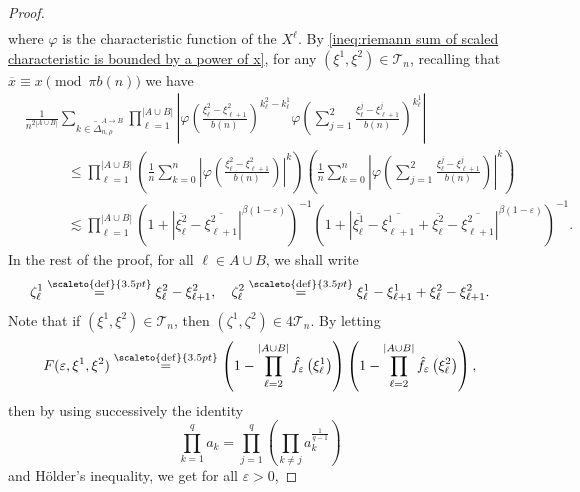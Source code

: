 \documentclass[12pt]{article}
\newcommand{\1}{\mathds{1}}
\newcommand{\eqdef}{\stackrel{\scaleto{\mathrm{def}}{3.5pt}}{=}}
\numberwithin{equation}{section}
\begin{document}
\begin{proof}
\begin{align}
    \end{align}
    where $\varphi$ is the characteristic function of the $X^\ell$. By \eqref{ineq:riemann sum of scaled characteristic is bounded by a power of x}, for any $(\xi^1,\xi^2)\in\mathcal T_n$, recalling that $\overline x\equiv x\pmod{\pi b(n)}$ we have 
    \begin{align}
        &\frac{1}{n^{2|A\cup B|}}\sum_{k\in\widetilde\Delta_{n,\rho}^{A\rightarrow B}}\prod_{\ell=1}^{|A\cup B|}\left|\varphi\left(\frac{\xi_\ell^{2}-\xi_{\ell+1}^{2}}{b(n)}\right)^{k_\ell^{2}-k_\ell^{1}}\varphi\left(\sum_{j=1}^2\frac{\xi_\ell^j-\xi_{\ell+1}^j}{b(n)}\right)^{k_\ell^{1}}\right|\nonumber\\
        &\hspace{3em}\le \prod_{\ell=1}^{|A\cup B|}\left(\frac{1}{n}\sum_{k=0}^n\left|\varphi\left(\frac{\xi_\ell^{2}-\xi_{\ell+1}^{2}}{b(n)}\right)\right|^k\right)\left(\frac{1}{n}\sum_{k=0}^n\left|\varphi\left(\sum_{j=1}^2\frac{\xi_\ell^j-\xi_{\ell+1}^j}{b(n)}\right)\right|^k\right)\nonumber\\
        &\hspace{3em}\lesssim\prod_{\ell=1}^{|A\cup B|}\left(1+\left|\overline{\xi_\ell^{2}}-\overline{\xi_{\ell+1}^{2}}\right|^{\beta(1-\varepsilon)}\right)^{-1}\left(1+\left|\overline{\xi_\ell^{1}}-\overline{\xi_{\ell+1}^{1}}+\overline{\xi_\ell^{2}}-\overline{\xi_{\ell+1}^{2}}\right|^{\beta(1-\varepsilon)}\right)^{-1}.\label{ineq:bound for the expectation in error calculation}
    \end{align}
    In the rest of the proof, for all $\ell\in A\cup B$, we shall write
    \begin{equation*}
        \zeta_\ell^{1}\eqdef\xi_\ell^{2}-\xi_{\ell+1}^{2},\quad\zeta_\ell^{2}\eqdef\xi_\ell^{1}-\xi_{\ell+1}^{1}+\xi_\ell^{2}-\xi_{\ell+1}^{2}.
    \end{equation*}
    Note that if $(\xi^1,\xi^2)\in\mathcal T_n$, then $(\zeta^{1},\zeta^{2})\in4\mathcal T_n$. By letting 
    \begin{equation*}
        F(\varepsilon,\xi^1,\xi^2)\eqdef\left(1-\prod_{\ell=2}^{|A\cup B|}\hat f_\varepsilon\left(\xi_\ell^1\right)\right)\left(1-\prod_{\ell=2}^{|A\cup B|}\hat f_\varepsilon\left(\xi_\ell^2\right)\right),
    \end{equation*}
    then by using successively the identity
    \begin{equation*}
        \prod_{k=1}^qa_k=\prod_{j=1}^q\left(\prod_{k\ne j}a_k^{\frac{1}{q-1}}\right)
    \end{equation*}
    and Hölder's inequality, we get for all $\varepsilon>0$,

\end{proof}
\end{document}
